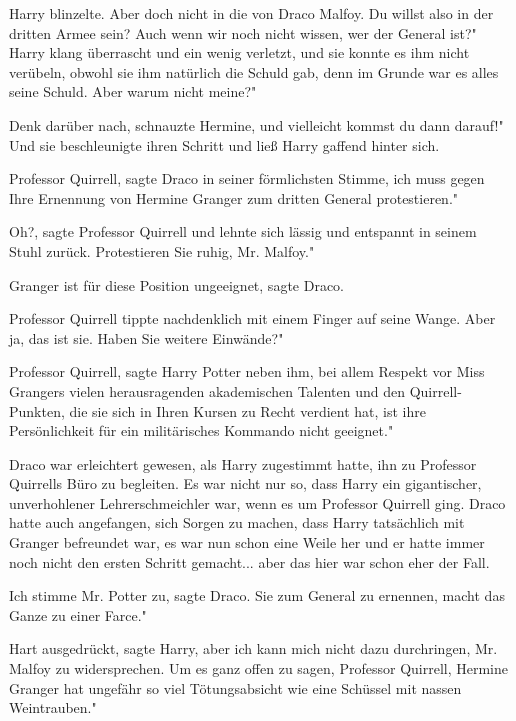 Harry blinzelte. \glqq{}Aber doch nicht in die von Draco Malfoy. Du willst also
in der dritten Armee sein? Auch wenn wir noch nicht wissen, wer der General
ist?" Harry klang überrascht und ein wenig verletzt, und sie konnte es ihm nicht
verübeln, obwohl sie ihm natürlich die Schuld gab, denn im Grunde war es alles
seine Schuld. \glqq{}Aber warum nicht meine?"

\glqq{}Denk darüber nach\grqq{}, schnauzte Hermine, \glqq{}und vielleicht kommst
du dann darauf!" Und sie beschleunigte ihren Schritt und ließ Harry gaffend
hinter sich.

\glqq{}Professor Quirrell\grqq{}, sagte Draco in seiner förmlichsten Stimme,
\glqq{}ich muss gegen Ihre Ernennung von Hermine Granger zum dritten General
protestieren."

\glqq{}Oh?\grqq{}, sagte Professor Quirrell und lehnte sich lässig und entspannt
in seinem Stuhl zurück. \glqq{}Protestieren Sie ruhig, Mr. Malfoy."

\glqq{}Granger ist für diese Position ungeeignet\grqq{}, sagte Draco.

Professor Quirrell tippte nachdenklich mit einem Finger auf seine Wange. \glqq{}
Aber ja, das ist sie. Haben Sie weitere Einwände?"

\glqq{}Professor Quirrell\grqq{}, sagte Harry Potter neben ihm, \glqq{}bei allem
Respekt vor Miss Grangers vielen herausragenden akademischen Talenten und den
Quirrell-Punkten, die sie sich in Ihren Kursen zu Recht verdient hat, ist ihre
Persönlichkeit für ein militärisches Kommando nicht geeignet."

Draco war erleichtert gewesen, als Harry zugestimmt hatte, ihn zu Professor
Quirrells Büro zu begleiten. Es war nicht nur so, dass Harry ein gigantischer,
unverhohlener Lehrerschmeichler war, wenn es um Professor Quirrell ging. Draco
hatte auch angefangen, sich Sorgen zu machen, dass Harry tatsächlich mit Granger
befreundet war, es war nun schon eine Weile her und er hatte immer noch nicht
den ersten Schritt gemacht... aber das hier war schon eher der Fall.

\glqq{}Ich stimme Mr. Potter zu\grqq{}, sagte Draco. \glqq{}Sie zum General zu
ernennen, macht das Ganze zu einer Farce."

\glqq{}Hart ausgedrückt\grqq{}, sagte Harry, \glqq{}aber ich kann mich nicht dazu
durchringen, Mr. Malfoy zu widersprechen. Um es ganz offen zu sagen, Professor
Quirrell, Hermine Granger hat ungefähr so viel Tötungsabsicht wie eine Schüssel
mit nassen Weintrauben."

